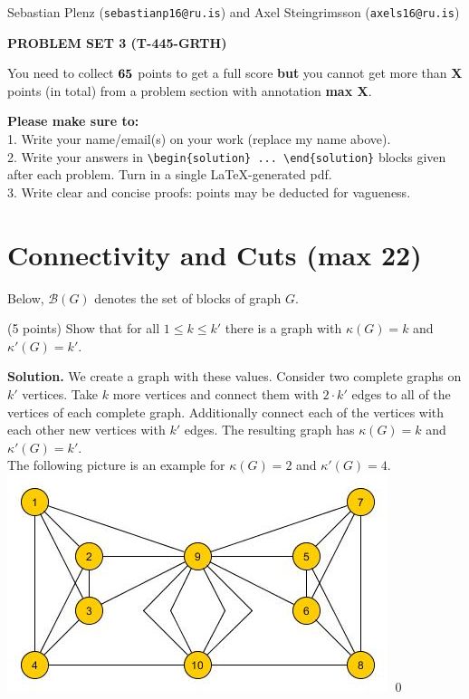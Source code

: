 \documentclass[a4paper,11pt]{amsart}
\newcounter{temp}
\newcounter{prob_counter}
\newenvironment{problem}
{\begin{list}{{\bf \arabic{prob_counter}}}{
      \usecounter{prob_counter}
      \addtolength{\labelsep}{.6ex}
      \addtolength{\itemsep}{4.3ex}
      \setlength{\leftmargin}{1.4em}}
      \setcounter{prob_counter}{\value{temp}}
}
{\setcounter{temp}{\value{prob_counter}}  
  \end{list}
}
\newenvironment{solution}{\textbf{Solution.}}{\qed}
\newcommand{\rubrik}[1]{\bigskip \begin{center}{\bf #1}\end{center} \medskip}
\begin{document}
\pagestyle{empty}
\thispagestyle{empty}

{\small{\sc\noindent
        Sebastian Plenz ({\tt sebastianp16@ru.is}) and Axel Steingrimsson ({\tt axels16@ru.is})
}}

\rubrik{PROBLEM SET 3 (T-445-GRTH)}

You need to collect $\bf 65$ points to get a full score {\bf but} you cannot get more than {\bf X} points (in total) from a problem section with annotation {\bf max X}.

{\bf Please make sure to:}\\
1. Write your name/email(s) on your work (replace my name above).\\
2. Write your answers in \texttt{{\textbackslash}begin\{solution\} ... {\textbackslash}end\{solution\}} blocks given after each problem. Turn in a single \LaTeX-generated pdf.\\
3. Write clear and concise proofs: points may be deducted for vagueness.




\section{Connectivity and Cuts ({\bf max 22})}

Below, $\mathcal{B}(G)$ denotes the set of blocks of graph $G$.

\begin{problem}
 \item (5 points) Show that for all $1 \le k \le k'$ there is a graph with $\kappa(G) = k$ and $\kappa'(G) = k'$. 
\end{problem}
\begin{solution}
	We create a graph with these values. Consider two complete graphs on $k'$ vertices. Take $k$ more vertices and connect them with $2 \cdot k'$ edges to all of the vertices of each complete graph. Additionally connect each of the vertices with each other new vertices with $k'$ edges. The resulting graph has $\kappa(G) = k$ and $\kappa'(G) = k'$. \\
	The following picture is an example for $\kappa(G) = 2$ and $\kappa'(G) = 4 $. \\
	\includegraphics{A1.jpg}
\end{solution}
\end{document}
